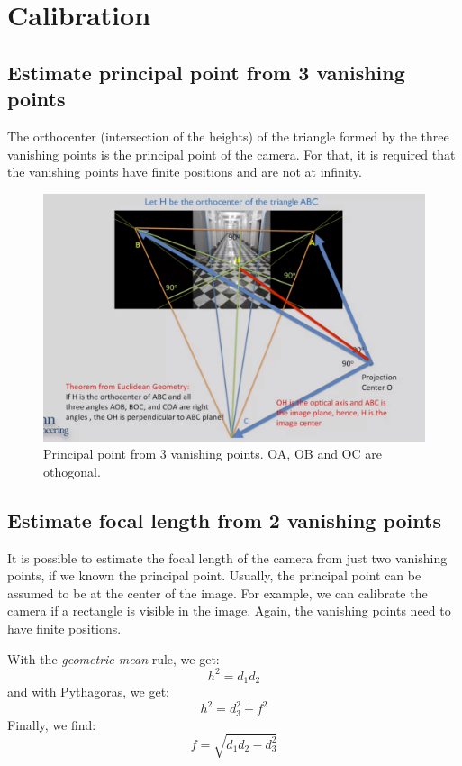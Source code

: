 \section{Calibration}
\subsection{Estimate principal point from 3 vanishing points}

The orthocenter (intersection of the heights) of the triangle formed by the three vanishing points is the principal point of the camera. For that, it is required that the vanishing points have finite positions and are not at infinity.


\begin{figure}[H]
    \centering
    \includegraphics[width=0.94\linewidth]{content/principal_point_from_vanishing_points.png}
    \caption{Principal point from 3 vanishing points. OA, OB and OC are othogonal.}
    \label{fig:principal_point_from_vanishing_points}
\end{figure}



\subsection{Estimate focal length from 2 vanishing points}

It is possible to estimate the focal length of the camera from just two vanishing points, if we known the principal point. Usually, the principal point can be assumed to be at the center of the image. For example, we can calibrate the camera if a rectangle is visible in the image. Again, the vanishing points need to have finite positions. 

With the \textit{geometric mean} rule, we get:
\begin{equation}
     h^2 = d_1 d_2
\end{equation}
and with Pythagoras, we get: 
\begin{equation}
    h^2 = d_3^2 + f^2
\end{equation}
Finally, we find:
\begin{equation}
    f = \sqrt{d_1 d_2 - d_3^2}    
\end{equation}


